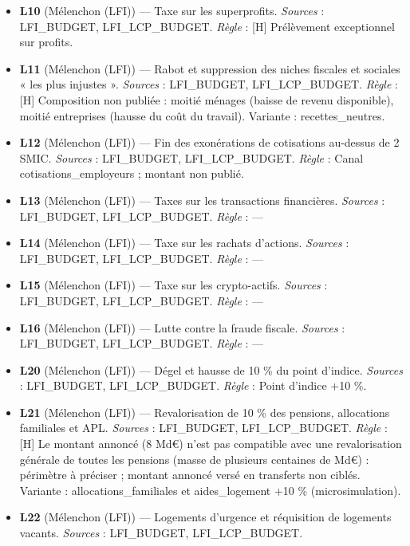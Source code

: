 \documentclass[
  11pt,
  11pt,
  a4paper,
  openany]{book}
\begin{document}
\begin{itemize}
  LFI\_LCP\_BUDGET. \emph{Règle} : {[}H{]} idem L08.
\item
  \textbf{L10} (Mélenchon (LFI)) --- Taxe sur les superprofits.
  \emph{Sources} : LFI\_BUDGET, LFI\_LCP\_BUDGET. \emph{Règle} : {[}H{]}
  Prélèvement exceptionnel sur profits.
\item
  \textbf{L11} (Mélenchon (LFI)) --- Rabot et suppression des niches
  fiscales et sociales « les plus injustes ». \emph{Sources} :
  LFI\_BUDGET, LFI\_LCP\_BUDGET. \emph{Règle} : {[}H{]} Composition non
  publiée : moitié ménages (baisse de revenu disponible), moitié
  entreprises (hausse du coût du travail). Variante : recettes\_neutres.
\item
  \textbf{L12} (Mélenchon (LFI)) --- Fin des exonérations de cotisations
  au-dessus de 2 SMIC. \emph{Sources} : LFI\_BUDGET, LFI\_LCP\_BUDGET.
  \emph{Règle} : Canal cotisations\_employeurs ; montant non publié.
\item
  \textbf{L13} (Mélenchon (LFI)) --- Taxes sur les transactions
  financières. \emph{Sources} : LFI\_BUDGET, LFI\_LCP\_BUDGET.
  \emph{Règle} : ---
\item
  \textbf{L14} (Mélenchon (LFI)) --- Taxe sur les rachats d'actions.
  \emph{Sources} : LFI\_BUDGET, LFI\_LCP\_BUDGET. \emph{Règle} : ---
\item
  \textbf{L15} (Mélenchon (LFI)) --- Taxe sur les crypto-actifs.
  \emph{Sources} : LFI\_BUDGET, LFI\_LCP\_BUDGET. \emph{Règle} : ---
\item
  \textbf{L16} (Mélenchon (LFI)) --- Lutte contre la fraude fiscale.
  \emph{Sources} : LFI\_BUDGET, LFI\_LCP\_BUDGET. \emph{Règle} : ---
\item
  \textbf{L20} (Mélenchon (LFI)) --- Dégel et hausse de 10 \% du point
  d'indice. \emph{Sources} : LFI\_BUDGET, LFI\_LCP\_BUDGET. \emph{Règle}
  : Point d'indice +10 \%.
\item
  \textbf{L21} (Mélenchon (LFI)) --- Revalorisation de 10 \% des
  pensions, allocations familiales et APL. \emph{Sources} : LFI\_BUDGET,
  LFI\_LCP\_BUDGET. \emph{Règle} : {[}H{]} Le montant annoncé (8 Md€)
  n'est pas compatible avec une revalorisation générale de toutes les
  pensions (masse de plusieurs centaines de Md€) : périmètre à préciser
  ; montant annoncé versé en transferts non ciblés. Variante :
  allocations\_familiales et aides\_logement +10 \% (microsimulation).
\item
  \textbf{L22} (Mélenchon (LFI)) --- Logements d'urgence et réquisition
  de logements vacants. \emph{Sources} : LFI\_BUDGET, LFI\_LCP\_BUDGET.

\end{itemize}
\end{document}
